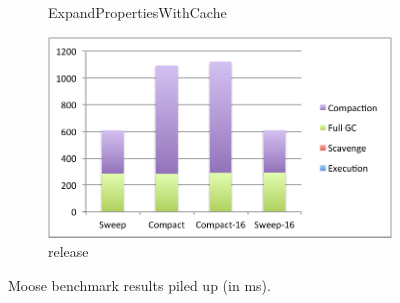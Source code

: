 \documentclass[10pt, sigplan]{acmart}
\begin{document}
\begin{figure}[thb]
\begin{subfigure}[b]{.48\textwidth}
	\caption{ExpandPropertiesWithCache}
	\end{subfigure}\hspace{0.03\textwidth}%
	   	\begin{subfigure}[b]{.48\textwidth}
	\includegraphics[width=\linewidth]{figures/release} 
	\caption{release}
   	\end{subfigure}

   	   	    	
\caption{Moose benchmark results piled up (in ms).}
\label{MooseRes1}
\end{figure}
\end{document}
